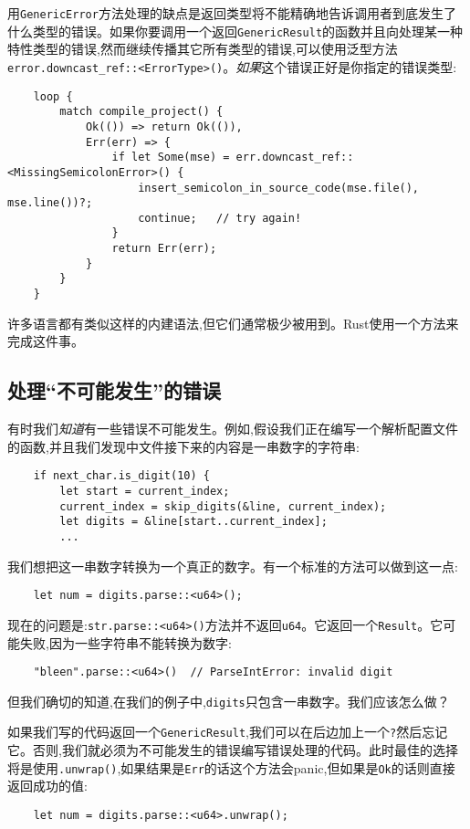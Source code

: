 用\texttt{GenericError}方法处理的缺点是返回类型将不能精确地告诉调用者到底发生了什么类型的错误。如果你要调用一个返回\texttt{GenericResult}的函数并且向处理某一种特性类型的错误,然而继续传播其它所有类型的错误,可以使用泛型方法\texttt{error.downcast\_ref::<ErrorType>()}。\emph{如果}这个错误正好是你指定的错误类型:
\begin{verbatim}
    loop {
        match compile_project() {
            Ok(()) => return Ok(()),
            Err(err) => {
                if let Some(mse) = err.downcast_ref::<MissingSemicolonError>() {
                    insert_semicolon_in_source_code(mse.file(), mse.line())?;
                    continue;   // try again!
                }
                return Err(err);
            }
        }
    }
\end{verbatim}

许多语言都有类似这样的内建语法,但它们通常极少被用到。Rust使用一个方法来完成这件事。

\subsection{处理“不可能发生”的错误}
有时我们\emph{知道}有一些错误不可能发生。例如,假设我们正在编写一个解析配置文件的函数,并且我们发现中文件接下来的内容是一串数字的字符串:
\begin{verbatim}
    if next_char.is_digit(10) {
        let start = current_index;
        current_index = skip_digits(&line, current_index);
        let digits = &line[start..current_index];
        ...
\end{verbatim}

我们想把这一串数字转换为一个真正的数字。有一个标准的方法可以做到这一点:
\begin{verbatim}
    let num = digits.parse::<u64>();
\end{verbatim}

现在的问题是:\texttt{str.parse::<u64>()}方法并不返回\texttt{u64}。它返回一个\texttt{Result}。它可能失败,因为一些字符串不能转换为数字:
\begin{verbatim}
    "bleen".parse::<u64>()  // ParseIntError: invalid digit
\end{verbatim}

但我们确切的知道,在我们的例子中,\texttt{digits}只包含一串数字。我们应该怎么做？

如果我们写的代码返回一个\texttt{GenericResult},我们可以在后边加上一个\texttt{?}然后忘记它。否则,我们就必须为不可能发生的错误编写错误处理的代码。此时最佳的选择将是使用\texttt{.unwrap()},如果结果是\texttt{Err}的话这个方法会panic,但如果是\texttt{Ok}的话则直接返回成功的值:
\begin{verbatim}
    let num = digits.parse::<u64>.unwrap();
\end{verbatim}

